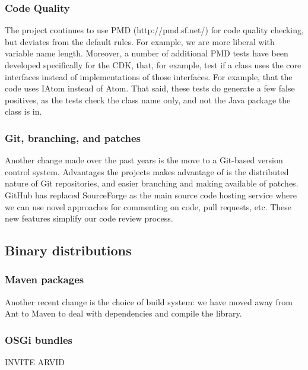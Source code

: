 \documentclass[10pt]{bmc_article}
\newenvironment{bmcformat}{\begin{raggedright}\baselineskip20pt\sloppy\setboolean{publ}{false}}{\end{raggedright}\baselineskip20pt\sloppy}
\begin{document}
\begin{bmcformat}
  \subsubsection*{Code Quality}

The project continues to use PMD (http://pmd.sf.net/) for code quality checking,
but deviates from the default rules. For example, we are more liberal with 
variable name length. Moreover, a number of additional PMD tests have been
developed specifically for the CDK, that, for example, test if a class uses
the core interfaces instead of implementations of those interfaces. For example,
that the code uses IAtom instead of Atom. That said, these tests do generate a
few false positives, as the tests check the class name only, and not the
Java package the class is in.

  \subsubsection*{Git, branching, and patches}

Another change made over the past years is the move to a Git-based version
control system. Advantages the projects makes advantage of is the distributed
nature of Git repositories, and easier branching and making available of
patches. GitHub has replaced SourceForge as the main source code hosting service
where we can use novel approaches for commenting on code, pull requests, etc.
These new features simplify our code review process.

\subsection*{Binary distributions}

\subsubsection*{Maven packages}

Another recent change is the choice of build system: we have moved away from
Ant to Maven to deal with dependencies and compile the library. 


\subsubsection*{OSGi bundles}

INVITE ARVID



\end{bmcformat}
\end{document}
